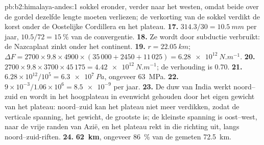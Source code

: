 \begin{solution}{pb:b2:himalaya-andes:1}
sokkel eronder, verder naar het westen, omdat beide over de gordel dezelfde lengte moeten verliezen; de verkorting van de sokkel
verdikt de korst onder de Oostelijke Cordillera en het plateau.
\textbf{17.} $314.3/30 = \qty{10.5}{mm}$ per jaar, $10.5/72 = \qty{15}{\percent}$ van de
convergentie.
\textbf{18.} Ze wordt door subductie verbruikt: de Nazcaplaat zinkt onder het continent.
\textbf{19.} $r = \qty{22.05}{km}$; $\Delta F = 2700\times9.8\times4900\times(35\,000 + 2450
+ 11\,025) = \qty{6.28e12}{N.m^{-1}}$.
\textbf{20.} $2700\times9.8\times3700\times45\,175 = \qty{4.42e12}{N.m^{-1}}$; de verhouding is
0.70.
\textbf{21.} $6.28\times10^{12}/10^{5} = \qty{6.3e7}{Pa}$, ongeveer \qty{63}{MPa}.
\textbf{22.} $9\times10^{-3}/1.06\times10^{6} = \num{8.5e-9}$ per jaar.
\textbf{23.} De duw van India werkt noord--zuid en wordt in het hoogplateau in evenwicht gehouden door het
eigen gewicht van het plateau: noord--zuid kan het plateau niet meer verdikken, zodat de verticale spanning,
het gewicht, de grootste is; de kleinste spanning is oost--west, naar de vrije randen van Azië,
en het plateau rekt in die richting uit, langs noord--zuid-riften.
\textbf{24.} \textbf{\qty[text-series-to-math=true]{62}{km}}, ongeveer \qty{86}{\percent} van de
gemeten \qty{72.5}{km}.
\end{solution}
